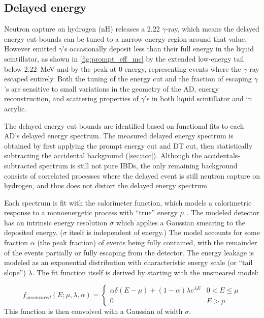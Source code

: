 \subsection{Delayed energy}
\label{subsec:delayed}

Neutron capture on hydrogen (nH) releases a
\SI{2.22}{\mev} $\gamma$-ray,
which means the delayed energy cut bounds can be tuned to a narrow energy region
around that value.
However emitted $\gamma$'s occasionally
deposit less than their full energy in the liquid scintillator,
as shown in \cref{fig:prompt_eff_mc} by the extended low-energy tail
below \SI{2.22}{\MeV} and by the peak at \num{0} energy,
representing events where the $\gamma$-ray escaped entirely.
Both the tuning of the energy cut
and the fraction of escaping $\gamma$'s are sensitive to
small variations in the geometry of the AD, energy reconstruction,
and scattering properties of $\gamma$'s in
both liquid scintillator and in acrylic.

The delayed energy cut bounds are identified based on
functional fits to each AD's delayed energy spectrum.
The measured delayed energy spectrum is obtained by first applying
the prompt energy cut and DT cut,
then statistically subtracting the accidental background (\cref{sec:acc}).
Although the accidentals-subtracted spectrum is still not pure IBDs,
the only remaining background consists of correlated processes
where the delayed event is still
neutron capture on hydrogen, and thus does not distort
the delayed energy spectrum.

Each spectrum is fit with the calorimeter function, which models
a calorimetric response to a monoenergetic process with ``true''
energy $\mu$ \cite{calorimeter2016}.
The modeled detector has an intrinsic energy resolution $\sigma$
which applies a Gaussian smearing to the deposited energy.
($\sigma$ itself is independent of energy.)
The model accounts for some fraction $\alpha$ (the peak fraction)
of events being fully contained,
with the remainder of the events partially or fully escaping from the detector.
The energy leakage is modeled as an exponential distribution
with characteristic energy scale (or ``tail slope'') $\lambda$.
The fit function itself is derived by starting with
the unsmeared model:

\begin{equation}
    f_{unsmeared}(E;\mu,\lambda,\alpha) =
    \begin{cases}
        \alpha\delta(E-\mu) + (1-\alpha)\lambda e^{\lambda E}
        & 0 < E \leq \mu \\
        0 & E > \mu
    \end{cases}
\end{equation}
This function is then convolved with a Gaussian
of width $\sigma$.

